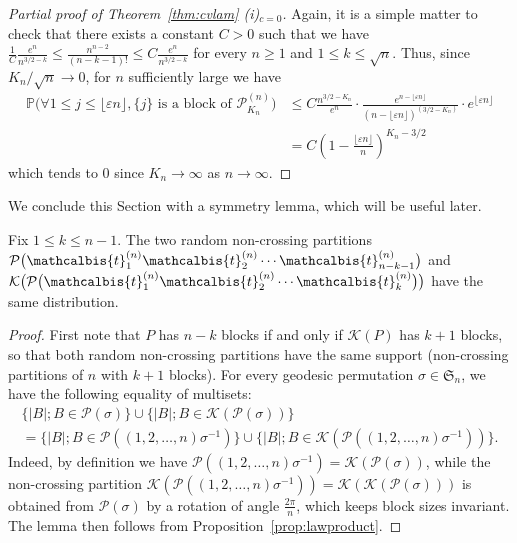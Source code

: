 \documentclass[AHL,XML,longabstracts,Unicode]{cedram}
\renewcommand{\P}{\mathbb{P}}
\def\PPP{\mathcal P}
\def\tb{\mathcalbis{t}}
\renewcommand{\epsilon}{\varepsilon}
\begin{document}
\begin{proof}[Partial proof of Theorem~\ref{thm:cvlam} (i)$_{c=0}$]
Again, it is a simple matter to check that there exists a constant $C>0$ such that we have $ \tfrac{1}{C}  \tfrac{ e^{n}}{n^{3/2-k}} \leq  \tfrac{n^{n-2}}{(n-k-1)!} \leq C \tfrac{ e^{n}}{n^{3/2-k}}$ for every $n \geq 1$ and $1 \leq k \leq  \sqrt{n}$. Thus, since $K_{n}/\sqrt{n} \rightarrow 0$, for $n$ sufficiently large we have
\begin{align*}
\P \big( \forall 1 \leq j \leq \lfloor \epsilon n \rfloor, \{j\} \textrm{ is a block of } \PPP^{(n)}_{K_{n}}  \big) &\leq C \frac{n^{3/2-K_{n}}}{e^{n}} \cdot  \frac{e^{n-\lfloor \epsilon n \rfloor}}{(n-\lfloor \epsilon n \rfloor)^{(3/2-K_{n})}} \cdot e^{\lfloor \epsilon n \rfloor}\\
&= C \left( 1- \frac{\lfloor \epsilon n \rfloor}{n} \right)^{K_{n}-3/2}
\end{align*}
which tends to $0$ since $K_{n} \rightarrow \infty$ as $n \rightarrow \infty$.
\end{proof}




We conclude this Section with a symmetry lemma, which will be useful later.

\begin{lemma}
\label{lem:symmetry}
Fix $1 \leq k \leq n-1$. The two random non-crossing partitions
$\PPP\big(\tb_{1}^{(n)} \tb_{2}^{(n)} \cdots \tb_{n-k-1}^{(n)}\big)$
and $\mathcal{K}\big( \PPP\big(\tb_{1}^{(n)} \tb_{2}^{(n)} \cdots \tb_{k}^{(n)}\big)\big)$ have the same distribution.
\end{lemma}

\begin{proof}
  First note that $P$ has $n-k$ blocks if and only if $\mathcal{K}(P)$ has $k+1$ blocks,
  so that both random non-crossing partitions have the same support (non-crossing partitions of $n$
  with $k+1$ blocks).
For every geodesic permutation $\sigma \in \mathfrak{S}_{n}$, we have the following equality of multisets:
\begin{multline*}
\{|B| ; B \in \mathcal{P}(\sigma) \} \cup  \{|B| ; B \in \mathcal{K}( \mathcal{P}(\sigma)) \}\\
  =\{|B| ; B \in \mathcal{P}((1,2, \ldots,n) \sigma^{-1} ) \} \cup  \{|B| ; B \in \mathcal{K}( \mathcal{P}((1,2, \ldots,n) \sigma^{-1} )) \}.
\end{multline*}
Indeed, by definition we have $\mathcal{P}( (1,2, \ldots,n) \sigma^{-1} )=\mathcal{K}( \mathcal{P}(\sigma))$,
while the non-crossing partition $\mathcal{K}( \mathcal{P}( (1,2, \ldots,n) \sigma^{-1} ))=\mathcal K(\mathcal K( \mathcal{P}(\sigma)))$ is obtained from $ \mathcal{P}(\sigma)$
by a rotation of angle $\tfrac{2\pi}{n}$, which keeps block sizes invariant.
The lemma then follows from Proposition~\ref{prop:lawproduct}.
\end{proof}
\end{document}
